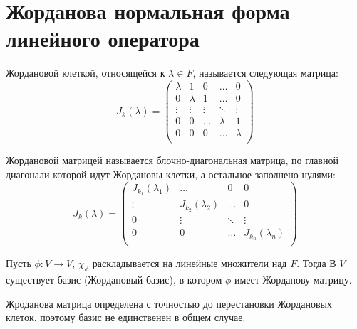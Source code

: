 \section{Жорданова нормальная форма линейного оператора}

\begin{reminder}
    Жордановой клеткой, относящейся к  $\lambda \in F$, называется следующая матрица:
    \[J_{k}(\lambda) = \begin{pmatrix}
	\lambda      & 1      & 0      & \dots  & 0\\
		0      & \lambda      & 1      & \dots  & 0\\
		\vdots & \vdots & \vdots & \ddots & \vdots \\
        0      & 0      & \dots      & \lambda  & 1\\
        0      & 0      & 0      & \dots  & \lambda \\
	\end{pmatrix}\]
\end{reminder}

\begin{definition}
    Жордановой матрицей называется блочно-диагональная матрица, по главной диагонали которой идут 
    Жордановы клетки, а остальное заполнено нулями:
    \[J_{k}(\lambda) = \begin{pmatrix}
        J_{k_1}(\lambda_1)      & \dots      & 0    & 0 \\
        \vdots      & J_{k_2}(\lambda_2)      & \dots   & 0 \\
        0   & \vdots     & \ddots    & \vdots \\
        0      & 0      & \dots    & J_{k_n}(\lambda_n) \\
        \end{pmatrix}\]
\end{definition}

\begin{theorem}
    Пусть $\phi : V \to V$, $\chi_{\phi}$ раскладывается на линейные множители над $F$. 
    Тогда В $V$ существует базис (Жордановый базис), в котором $\phi$ имеет Жорданову матрицу.
\end{theorem}

\begin{note}
    Жроданова матрица определена с точностью до перестановки Жордановых клеток, поэтому базис не единственен в общем случае.
\end{note}

